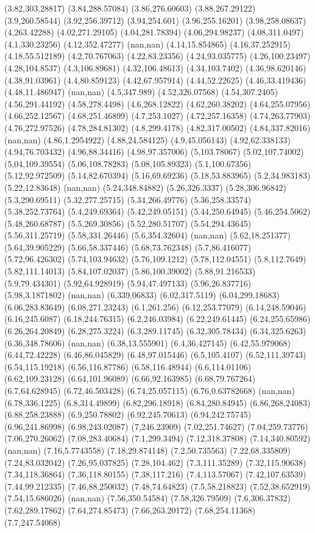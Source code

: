 (3.82,303.28817) (3.84,288.57084) (3.86,276.60603) (3.88,267.29122) (3.9,260.58544) (3.92,256.39712) (3.94,254.601) (3.96,255.16201) (3.98,258.08637) (4,263.42288) (4.02,271.29105) (4.04,281.78394) (4.06,294.98237) (4.08,311.0497) (4.1,330.23256) (4.12,352.47277) (nan,nan) (4.14,15.854865) (4.16,37.252915) (4.18,55.512189) (4.2,70.767063) (4.22,83.23356) (4.24,93.035775) (4.26,100.23497) (4.28,104.8537) (4.3,106.89681) (4.32,106.48613) (4.34,103.7402) (4.36,98.620146) (4.38,91.03961) (4.4,80.859123) (4.42,67.957914) (4.44,52.22625) (4.46,33.419436) (4.48,11.486947) (nan,nan) (4.5,347.989) (4.52,326.07568) (4.54,307.2405) (4.56,291.44192) (4.58,278.4498) (4.6,268.12822) (4.62,260.38202) (4.64,255.07956) (4.66,252.12567) (4.68,251.46899) (4.7,253.1027) (4.72,257.16358) (4.74,263.77903) (4.76,272.97526) (4.78,284.81302) (4.8,299.4178) (4.82,317.00502) (4.84,337.82016) (nan,nan) (4.86,1.2954922) (4.88,24.584125) (4.9,45.056143) (4.92,62.338133) (4.94,76.703432) (4.96,88.34416) (4.98,97.357006) (5,103.78067) (5.02,107.74002) (5.04,109.39554) (5.06,108.78283) (5.08,105.89323) (5.1,100.67356) (5.12,92.972509) (5.14,82.670394) (5.16,69.69236) (5.18,53.883965) (5.2,34.983183) (5.22,12.83648) (nan,nan) (5.24,348.84882) (5.26,326.3337) (5.28,306.96842) (5.3,290.69511) (5.32,277.25715) (5.34,266.49776) (5.36,258.33574) (5.38,252.73764) (5.4,249.69364) (5.42,249.05151) (5.44,250.64945) (5.46,254.5062) (5.48,260.68787) (5.5,269.30856) (5.52,280.51707) (5.54,294.43645) (5.56,311.25719) (5.58,331.26446) (5.6,354.32604) (nan,nan) (5.62,18.251377) (5.64,39.905229) (5.66,58.337446) (5.68,73.762348) (5.7,86.416077) (5.72,96.426302) (5.74,103.94632) (5.76,109.1212) (5.78,112.04551) (5.8,112.7649) (5.82,111.14013) (5.84,107.02037) (5.86,100.39002) (5.88,91.216533) (5.9,79.434301) (5.92,64.928919) (5.94,47.497133) (5.96,26.837716) (5.98,3.1871802) (nan,nan) (6,339.06833) (6.02,317.5119) (6.04,299.18683) (6.06,283.83649) (6.08,271.23243) (6.1,261.256) (6.12,253.77079) (6.14,248.59046) (6.16,245.6087) (6.18,244.76315) (6.2,246.03984) (6.22,249.61445) (6.24,255.65986) (6.26,264.20849) (6.28,275.3224) (6.3,289.11745) (6.32,305.78434) (6.34,325.6263) (6.36,348.78606) (nan,nan) (6.38,13.555901) (6.4,36.427145) (6.42,55.979068) (6.44,72.42228) (6.46,86.045829) (6.48,97.015446) (6.5,105.4107) (6.52,111.39743) (6.54,115.19218) (6.56,116.87786) (6.58,116.48944) (6.6,114.01106) (6.62,109.23128) (6.64,101.96089) (6.66,92.163985) (6.68,79.767264) (6.7,64.628945) (6.72,46.503428) (6.74,25.057115) (6.76,0.63782668) (nan,nan) (6.78,336.1225) (6.8,314.49899) (6.82,296.18918) (6.84,280.84945) (6.86,268.24083) (6.88,258.23888) (6.9,250.78802) (6.92,245.70613) (6.94,242.75745) (6.96,241.86998) (6.98,243.02087) (7,246.23909) (7.02,251.74627) (7.04,259.73776) (7.06,270.26062) (7.08,283.40684) (7.1,299.3494) (7.12,318.37808) (7.14,340.80592) (nan,nan) (7.16,5.7743558) (7.18,29.874148) (7.2,50.735563) (7.22,68.335809) (7.24,83.032042) (7.26,95.037825) (7.28,104.462) (7.3,111.35289) (7.32,115.90638) (7.34,118.36864) (7.36,118.80155) (7.38,117.216) (7.4,113.57067) (7.42,107.63539) (7.44,99.212335) (7.46,88.250032) (7.48,74.64823) (7.5,58.218823) (7.52,38.652919) (7.54,15.686026) (nan,nan) (7.56,350.54584) (7.58,326.79509) (7.6,306.37832) (7.62,289.17862) (7.64,274.85473) (7.66,263.20172) (7.68,254.11368) (7.7,247.54068) 